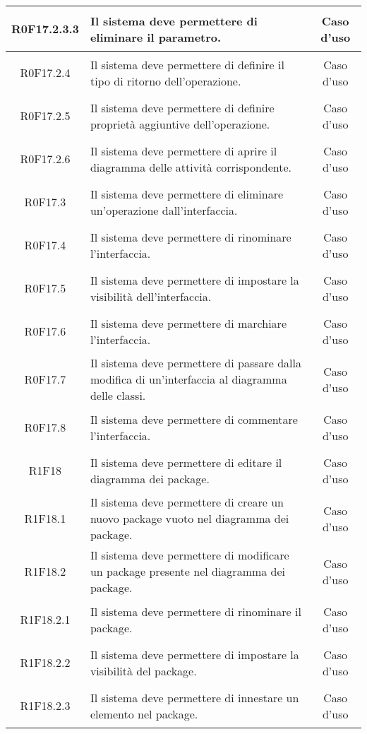 \documentclass[../AnalisiDeiRequisiti.tex]{subfiles}
\begin{document}
\begin{longtable}{|c|>{\centering}p{7cm}|c|}
\hypertarget{R0F17.2.3.3}{R0F17.2.3.3} & Il sistema deve permettere di eliminare il parametro. & Caso d'uso \\ \hline
\hypertarget{R0F17.2.4}{R0F17.2.4} & Il sistema deve permettere di definire il tipo di ritorno dell'operazione. & Caso d'uso \\ \hline
\hypertarget{R0F17.2.5}{R0F17.2.5} & Il sistema deve permettere di definire proprietà aggiuntive dell'operazione. & Caso d'uso \\ \hline
\hypertarget{R0F17.2.6}{R0F17.2.6} & Il sistema deve permettere di aprire il diagramma delle attività corrispondente. & Caso d'uso \\ \hline
\hypertarget{R0F17.3}{R0F17.3} & Il sistema deve permettere di eliminare un'operazione dall'interfaccia. 

& Caso d'uso \\ \hline
\hypertarget{R0F17.4}{R0F17.4} & Il sistema deve permettere di rinominare l'interfaccia. & Caso d'uso \\ \hline
\hypertarget{R0F17.5}{R0F17.5} & Il sistema deve permettere di impostare la visibilità dell'interfaccia. & Caso d'uso \\ \hline
\hypertarget{R0F17.6}{R0F17.6} & Il sistema deve permettere di marchiare l'interfaccia. & Caso d'uso \\ \hline
\hypertarget{R0F17.7}{R0F17.7} & Il sistema deve permettere di passare dalla modifica di un'interfaccia al diagramma delle classi. & Caso d'uso \\ \hline
\hypertarget{R0F17.8}{R0F17.8} & Il sistema deve permettere di commentare l'interfaccia. & Caso d'uso \\ \hline
\hypertarget{R1F18}{R1F18} & Il sistema deve permettere di editare il diagramma dei package. & Caso d'uso \\ \hline
\hypertarget{R1F18.1}{R1F18.1} & Il sistema deve permettere di creare un nuovo package vuoto nel diagramma dei package. & Caso d'uso \\ \hline
\hypertarget{R1F18.2}{R1F18.2} & Il sistema deve permettere di modificare un package presente nel diagramma dei package. & Caso d'uso \\ \hline
\hypertarget{R1F18.2.1}{R1F18.2.1} & Il sistema deve permettere di rinominare il package. & Caso d'uso \\ \hline
\hypertarget{R1F18.2.2}{R1F18.2.2} & Il sistema deve permettere di impostare la visibilità del package. & Caso d'uso \\ \hline
\hypertarget{R1F18.2.3}{R1F18.2.3} & Il sistema deve permettere di innestare un elemento nel package. & Caso d'uso \\ \hline

\end{longtable}
\end{document}
